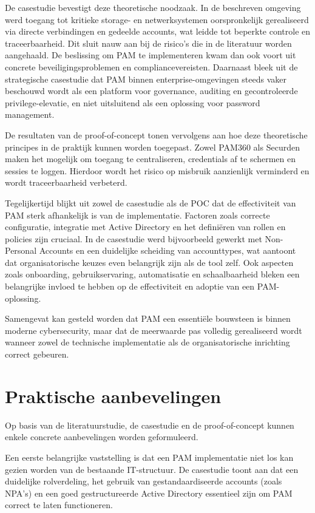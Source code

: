 De casestudie bevestigt deze theoretische noodzaak. In de beschreven omgeving werd toegang tot kritieke storage- en netwerksystemen oorspronkelijk gerealiseerd via directe verbindingen en gedeelde accounts, wat leidde tot beperkte controle en traceerbaarheid. Dit sluit nauw aan bij de risico’s die in de literatuur worden aangehaald. De beslissing om PAM te implementeren kwam dan ook voort uit concrete beveiligingsproblemen en compliancevereisten. Daarnaast bleek uit de strategische casestudie dat PAM binnen enterprise-omgevingen steeds vaker beschouwd wordt als een platform voor governance, auditing en gecontroleerde privilege-elevatie, en niet uitsluitend als een oplossing voor password management.

De resultaten van de proof-of-concept tonen vervolgens aan hoe deze theoretische principes in de praktijk kunnen worden toegepast. Zowel PAM360 als Securden maken het mogelijk om toegang te centraliseren, credentials af te schermen en sessies te loggen. Hierdoor wordt het risico op misbruik aanzienlijk verminderd en wordt traceerbaarheid verbeterd.

Tegelijkertijd blijkt uit zowel de casestudie als de POC dat de effectiviteit van PAM sterk afhankelijk is van de implementatie. Factoren zoals correcte configuratie, integratie met Active Directory en het definiëren van rollen en policies zijn cruciaal. In de casestudie werd bijvoorbeeld gewerkt met Non-Personal Accounts en een duidelijke scheiding van accounttypes, wat aantoont dat organisatorische keuzes even belangrijk zijn als de tool zelf. Ook aspecten zoals onboarding, gebruikservaring, automatisatie en schaalbaarheid bleken een belangrijke invloed te hebben op de effectiviteit en adoptie van een PAM-oplossing.

Samengevat kan gesteld worden dat PAM een essentiële bouwsteen is binnen moderne cybersecurity, maar dat de meerwaarde pas volledig gerealiseerd wordt wanneer zowel de technische implementatie als de organisatorische inrichting correct gebeuren.
\section{Praktische aanbevelingen}
Op basis van de literatuurstudie, de casestudie en de proof-of-concept kunnen enkele concrete aanbevelingen worden geformuleerd.

Een eerste belangrijke vaststelling is dat een PAM implementatie niet los kan gezien worden van de bestaande IT-structuur. De casestudie toont aan dat een duidelijke rolverdeling, het gebruik van gestandaardiseerde accounts (zoals NPA’s) en een goed gestructureerde Active Directory essentieel zijn om PAM correct te laten functioneren.

